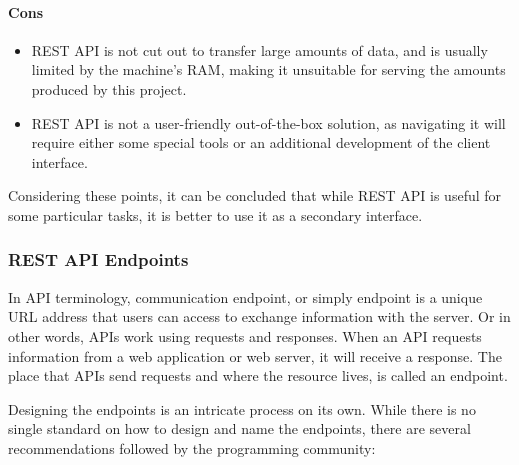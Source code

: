 \documentclass[thesis=M,english,hidelinks]{FITthesis}[2019/12/23]
\begin{document}
\paragraph{Cons}
\begin{itemize}
	\item REST API is not cut out to transfer large amounts of data, and is usually limited by the machine's RAM, making it unsuitable for serving the amounts produced by this project.
	\item REST API is not a user-friendly out-of-the-box solution, as navigating it will require either some special tools or an additional development of the client interface.
\end{itemize}

Considering these points, it can be concluded that while \gls{REST} \gls{API} is useful for some particular tasks, it is better to use it as a secondary interface. 

\subsubsection{REST API Endpoints}

In \gls{API} terminology, communication endpoint, or simply endpoint is a unique URL address that users can access to exchange information with the server. Or in other words, APIs work using requests and responses. When an API requests information from a web application or web server, it will receive a response. The place that APIs send requests and where the resource lives, is called an endpoint. 

Designing the endpoints is an intricate process on its own. While there is no single standard on how to design and name the endpoints, there are several recommendations followed by the programming community\cite{REST_Design}:
\end{document}
